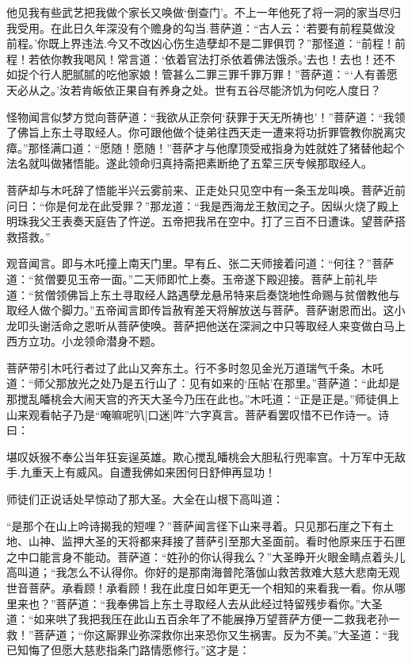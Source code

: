 \documentclass[12pt,UTF8]{ctexbook}
\begin{document}
{他见我有些武艺把我做个家长又唤做‘倒查门’。不上一年他死了将一洞的家当尽归我受用。在此日久年深没有个赡身的勾当.菩萨道：“古人云：‘若要有前程莫做没前程。’你既上界违法.今又不改凶心伤生造孽却不是二罪俱罚？”那怪道：“前程！前程！若依你教我喝风！常言道：‘依着官法打杀依着佛法饿杀。’去也！去也！还不如捉个行人肥腻腻的吃他家娘！管甚么二罪三罪千罪万罪！”菩萨道：“‘人有善愿天必从之。’汝若肯皈依正果自有养身之处。世有五谷尽能济饥为何吃人度日？

怪物闻言似梦方觉向菩萨道：“我欲从正奈何‘获罪于天无所祷也’！”菩萨道：“我领了佛旨上东土寻取经人。你可跟他做个徒弟往西天走一遭来将功折罪管教你脱离灾瘴。”那怪满口道：“愿随！愿随！”菩萨才与他摩顶受戒指身为姓就姓了猪替他起个法名就叫做猪悟能。遂此领命归真持斋把素断绝了五荤三厌专候那取经人。

菩萨却与木吒辞了悟能半兴云雾前来、正走处只见空中有一条玉龙叫唤。菩萨近前问日：“你是何龙在此受罪？”那龙道：“我是西海龙王敖闰之子。因纵火烧了殿上明珠我父王表奏天庭告了忤逆。五帝把我吊在空中。打了三百不日遭诛。望菩萨搭救搭救。”

观音闻言。即与木吒撞上南天门里。早有丘、张二天师接着问道：“何往？”菩萨道：“贫僧要见玉帝一面。”二天师即忙上奏。玉帝遂下殿迎接。菩萨上前礼毕道：“贫僧领佛旨上东土寻取经人路遇孽龙悬吊特来启奏饶地性命赐与贫僧教他与取经人做个脚力。”五帝闻言即传旨赦宥差天将解放送与菩萨。菩萨谢恩而出。这小龙叩头谢活命之恩听从菩萨使唤。菩萨把他送在深涧之中只等取经人来变做白马上西方立功。小龙领命潜身不题。

菩萨带引木吒行者过了此山又奔东土。行不多时忽见金光万道瑞气千条。木吒道：“师父那放光之处乃是五行山了：见有如来的‘压帖’在那里。”菩萨道：“此却是那搅乱皤桃会大闹天宫的齐天大圣今乃压在此也。”木吒道：“正是正是。”师徒俱上山来观看帖子乃是“唵嘛呢叭[口迷]吽”六字真言。菩萨看罢叹惜不已作诗一。诗曰：

堪叹妖猴不奉公当年狂妄逞英雄。欺心搅乱皤桃会大胆私行兜率宫。十万军中无敌手.九重天上有威风。自遭我佛如来困何日舒伸再显功！

师徒们正说话处早惊动了那大圣。大全在山根下高叫道：

“是那个在山上吟诗揭我的短哩？”菩萨闻言径下山来寻着。只见那石崖之下有土地、山神、监押大圣的天将都来拜接了菩萨引至那大圣面前。看时他原来压于石匣之中口能言身不能动。菩萨道：“姓孙的你认得我么？”大圣睁开火眼金睛点着头儿高叫道；“我怎么不认得你。你好的是那南海普陀落伽山救苦救难大慈大悲南无观世音菩萨。承看顾！承看顾！我在此度日如年更无一个相知的来看我一看。你从哪里来也？”菩萨道：“我奉佛旨上东土寻取经人去从此经过特留残步看你。”大圣道：“如来哄了我把我压在此山五百余年了不能展挣万望菩萨方便一二救我老孙一救！”菩萨道；“你这厮罪业弥深救你出来恐你又生祸害。反为不美。”大圣道：“我已知悔了但愿大慈悲指条门路情愿修行。”这才是：

}
\end{document}
